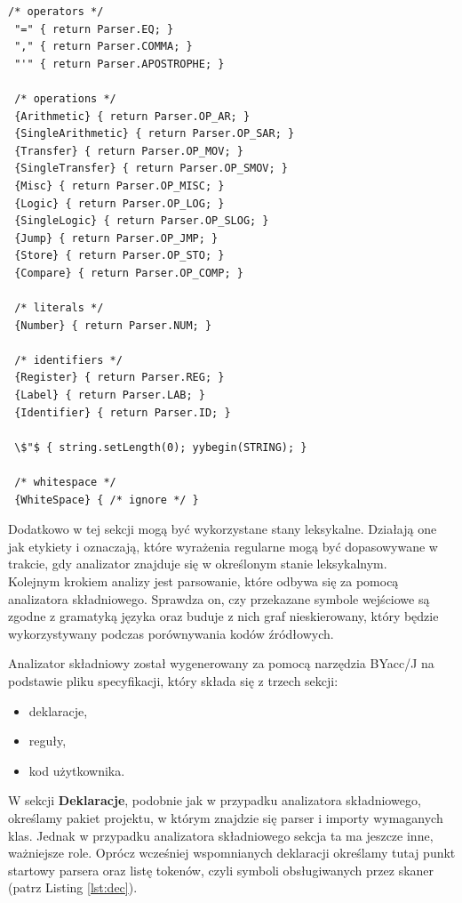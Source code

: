 \documentclass[a4paper,12pt]{article}
\begin{document}
\begin{lstlisting}[mathescape, caption={Lista reguł leksykalnych w programie CodeComp.}, label={lst:reguly}]
 /* operators */
 "=" { return Parser.EQ; }
 "," { return Parser.COMMA; }
 "'" { return Parser.APOSTROPHE; }
 
 /* operations */
 {Arithmetic} { return Parser.OP_AR; }
 {SingleArithmetic} { return Parser.OP_SAR; }
 {Transfer} { return Parser.OP_MOV; }
 {SingleTransfer} { return Parser.OP_SMOV; } 
 {Misc} { return Parser.OP_MISC; }
 {Logic} { return Parser.OP_LOG; }
 {SingleLogic} { return Parser.OP_SLOG; }
 {Jump} { return Parser.OP_JMP; }
 {Store} { return Parser.OP_STO; }
 {Compare} { return Parser.OP_COMP; }
 
 /* literals */
 {Number} { return Parser.NUM; }
 
 /* identifiers */
 {Register} { return Parser.REG; }
 {Label} { return Parser.LAB; }
 {Identifier} { return Parser.ID; }
 
 \$"$ { string.setLength(0); yybegin(STRING); }
 
 /* whitespace */ 
 {WhiteSpace} { /* ignore */ }
\end{lstlisting}

Dodatkowo w tej sekcji mogą być wykorzystane stany leksykalne. Działają one jak etykiety i oznaczają, które wyrażenia regularne mogą być dopasowywane w trakcie, gdy analizator znajduje się w określonym stanie leksykalnym.
\\

Kolejnym krokiem analizy jest parsowanie, które odbywa się za pomocą analizatora składniowego. Sprawdza on, czy przekazane symbole wejściowe są zgodne z gramatyką języka oraz buduje z nich graf nieskierowany, który będzie wykorzystywany podczas porównywania kodów źródłowych.

Analizator składniowy został wygenerowany za pomocą narzędzia BYacc/J\cite{byaccj} na podstawie pliku specyfikacji, który składa się z trzech sekcji:
\begin{itemize}
\item deklaracje,
\item reguły,
\item kod użytkownika.
\end{itemize}

W sekcji \textbf{Deklaracje}, podobnie jak w przypadku analizatora składniowego, określamy pakiet projektu, w którym znajdzie się parser i importy wymaganych klas. Jednak w przypadku analizatora składniowego sekcja ta ma jeszcze inne, ważniejsze role. Oprócz wcześniej wspomnianych deklaracji określamy tutaj punkt startowy parsera oraz listę tokenów, czyli symboli obsługiwanych przez skaner (patrz Listing \ref{lst:dec}).
\end{document}
